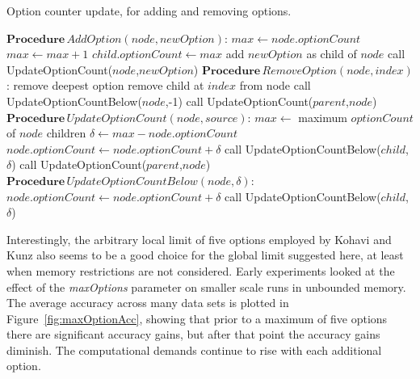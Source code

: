 \begin{algorithm}
\caption{Option counter update, for adding and removing options.}
\begin{algorithmic}
\STATE $\mathbf{Procedure} \, AddOption(node, newOption)$:
\STATE $max \gets node.optionCount$
\STATE $max \gets max+1$
\ENDIF
{}
\STATE $child.optionCount \gets max$
\ENDFOR
\STATE add $newOption$ as child of $node$
\STATE call UpdateOptionCount($node$,$newOption$)
\STATE
\STATE $\mathbf{Procedure} \, RemoveOption(node, index)$:
\STATE remove deepest option
\ENDWHILE
\STATE remove child at $index$ from node
\STATE call UpdateOptionCountBelow($node$,-1)
\STATE call UpdateOptionCount($parent$,$node$)
\ENDIF
\STATE
\STATE $\mathbf{Procedure} \, UpdateOptionCount(node, source)$:
\STATE $max \gets$ maximum $optionCount$ of $node$ children
\STATE $\delta \gets max - node.optionCount$
\STATE $node.optionCount \gets node.optionCount + \delta$
\STATE call UpdateOptionCountBelow($child$,$\delta$)
\ENDFOR
{}
\STATE call UpdateOptionCount($parent$,$node$)
\ENDIF
\ENDIF
\STATE
\STATE $\mathbf{Procedure} \, UpdateOptionCountBelow(node, \delta)$:
\STATE $node.optionCount \gets node.optionCount + \delta$
\STATE call UpdateOptionCountBelow($child$, $\delta$)
\ENDFOR
\end{algorithmic}
\label{alg:hotcounter}
\end{algorithm}

Interestingly, the arbitrary local limit of five options employed by Kohavi and Kunz also seems to be a good choice for the global limit suggested here, at least when memory restrictions are not considered. Early experiments looked at the effect of the {\em maxOptions} parameter on smaller scale runs in unbounded memory. The average accuracy across many data sets is plotted in Figure~\ref{fig:maxOptionAcc}, showing that prior to a maximum of five options there are significant accuracy gains, but after that point the accuracy gains diminish. The computational demands continue to rise with each additional option.

